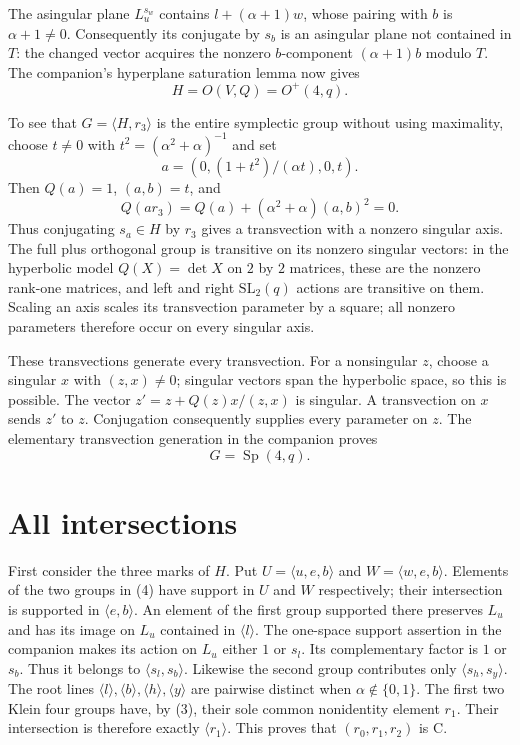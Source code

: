 \documentclass[11pt,a4paper]{article}
\newcommand{\gen}[1]{\langle#1\rangle}
\begin{document}
The asingular plane $L_u^{s_w}$ contains
$l+(\alpha+1)w$, whose pairing with $b$ is $\alpha+1\ne0$.
Consequently its conjugate by $s_b$ is an asingular plane not
contained in $T$: the changed vector acquires the nonzero
$b$-component $(\alpha+1)b$ modulo $T$.
The companion's hyperplane saturation lemma now gives
\[
                         H=O(V,Q)=O^+(4,q).                \tag{5}
\]

To see that $G=\gen{H,r_3}$ is the entire symplectic group without
using maximality, choose $t\ne0$ with
$t^2=(\alpha^2+\alpha)^{-1}$ and set
\[
       a=(0,(1+t^2)/(\alpha t),0,t).
\]
Then $Q(a)=1$, $(a,b)=t$, and
\[
 Q(a r_3)=Q(a)+(\alpha^2+\alpha)(a,b)^2=0.
\]
Thus conjugating $s_a\in H$ by $r_3$ gives a transvection with
a nonzero singular axis. The full plus orthogonal group is transitive
on its nonzero singular vectors: in the hyperbolic model
$Q(X)=\det X$ on $2$ by $2$ matrices, these are the nonzero
rank-one matrices, and left and right $\mathrm{SL}_2(q)$ actions
are transitive on them. Scaling an axis scales its transvection
parameter by a square; all nonzero parameters therefore occur
on every singular axis.

These transvections generate every transvection. For a nonsingular
$z$, choose a singular $x$ with $(z,x)\ne0$; singular vectors span
the hyperbolic space, so this is possible. The vector
$z'=z+Q(z)x/(z,x)$ is singular. A transvection on $x$ sends $z'$
to $z$. Conjugation consequently supplies every parameter on $z$.
The elementary transvection generation in the companion proves
\[
                            G=\operatorname{Sp}(4,q).       \tag{6}
\]

\section{All intersections}
First consider the three marks of $H$. Put
$U=\gen{u,e,b}$ and $W=\gen{w,e,b}$. Elements of the two
groups in (4) have support in $U$ and $W$ respectively; their
intersection is supported in $\gen{e,b}$.
An element of the first group supported there preserves $L_u$
and has its image on $L_u$ contained in $\gen l$. The
one-space support assertion in the companion makes its action
on $L_u$ either $1$ or $s_l$. Its complementary factor is
$1$ or $s_b$. Thus it belongs to $\gen{s_l,s_b}$.
Likewise the second group contributes only $\gen{s_h,s_y}$.
The root lines $\gen l,\gen b,\gen h,\gen y$ are pairwise
distinct when $\alpha\notin\{0,1\}$. The first two Klein four
groups have, by (3), their sole common nonidentity element $r_1$.
Their intersection is therefore exactly $\gen{r_1}$.
This proves that $(r_0,r_1,r_2)$ is C.
\end{document}
